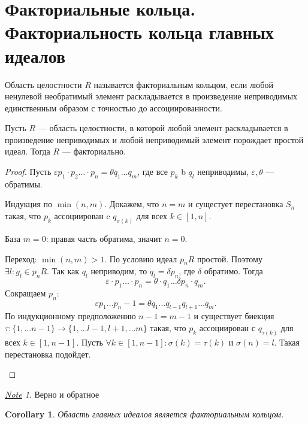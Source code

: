 \documentclass[11pt]{book}
\theoremstyle{definition}
\theoremstyle{plain}
\theoremstyle{plain}
\newtheorem{lm}{Lemma}
\newtheorem{cor}{Corollary}
\theoremstyle{definition}
\theoremstyle{remark}
\newtheorem*{note}{\underline{Note}}
\begin{document}
\section{Факториальные кольца. Факториальность кольца главных идеалов}
\begin{defn}
    Область целостности $ R$ называется {\sf факториальным кольцом}, если любой ненулевой  необратимый элемент  раскладывается в произведение неприводимых единственным образом с точностью до ассоциированности.
\end{defn}
%
\begin{thm}
    Пусть $ R$ --- область  целостности, в которой любой элемент раскладывается в произведение неприводимых и любой неприводимый элемент порождает простой идеал. Тогда $ R$ --- факториально.
\end{thm}
\begin{proof}
    Пусть $ \varepsilon  p_1 \cdot p_2 \ldots  \cdot p_n = \theta q_1 \ldots  q_m$, где все $ p_k$ b  $ q_l$ неприводимы,  $ \varepsilon, \theta $ --- обратимы.

    Индукция по $ \min(n, m)$. Докажем, что $ n = m$ и сущестует перестановка  $ S_n$ такая, что  $ p_k$ ассоциирован c  $ q_{\sigma(k)}$ для всех $ k \in [1, n]$.
    \begin{description}
	\item
	    База $m=0$: правая часть обратима, значит $ n = 0$.
	\item Переход: $ \min(n, m) > 1$.
	    По условию идеал $ p_nR$ простой. Поэтому  $ \exists l: g_{l} \in p_nR$.
	    Так как $ q_l$ неприводим, то  $ q_l = \delta p_n$, где  $ \delta$ обратимо.
	    Тогда
	    \[
		\varepsilon \cdot p_1 \ldots \cdot p_n = \theta \cdot  q_1 \ldots  \delta p_n \cdot q_m
	    .\]
	    Сокращаем $ p_n$:
	    \[
		\varepsilon p_1 \ldots p_n-1 = \theta q_1 \ldots q_{l-1} q_{l+1} \ldots q_m
	    .\]
	    По индукционному предположению $ n - 1= m - 1$ и существует биекция  $ \tau: \{1, \ldots n-1\} \to  \{1, \ldots l-1, l+1, \ldots m\}$ такая, что $ p_k$ ассоциирован с $ q_{\tau(k)}$ для всех $ k \in [1, n-1]$. Пусть $ \forall k \in [1, n-1]: \sigma(k) = \tau(k)$  и $\sigma(n) = l$. Такая перестановка подойдет.
    \end{description}
\end{proof}
\begin{note}
    Верно и обратное
\end{note}
\begin{cor}
    Область главных идеалов является факториальным кольцом.
\end{cor}
\end{document}
